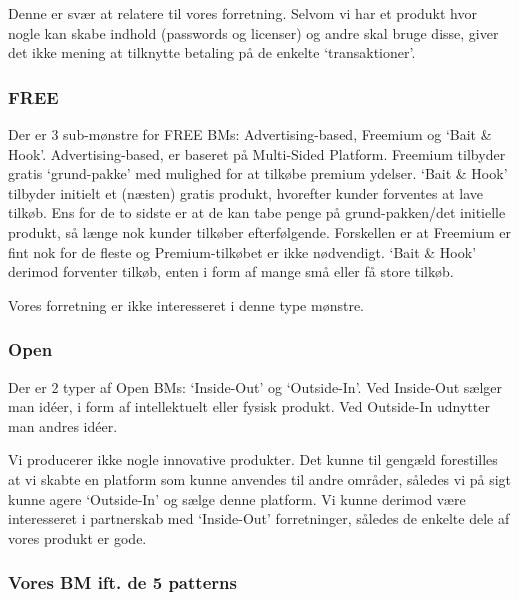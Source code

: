 Denne er svær at relatere til vores forretning.
Selvom vi har et produkt hvor nogle kan skabe indhold (passwords og licenser) og andre skal bruge disse, giver det ikke mening at tilknytte betaling på de enkelte `transaktioner'.

\subsubsection{FREE}
Der er 3 sub-mønstre for FREE BMs: Advertising-based, Freemium og `Bait \& Hook'.
Advertising-based, er baseret på Multi-Sided Platform.
Freemium tilbyder gratis `grund-pakke' med mulighed for at tilkøbe premium ydelser.
`Bait \& Hook' tilbyder initielt et (næsten) gratis produkt, hvorefter kunder forventes at lave tilkøb.
Ens for de to sidste er at de kan tabe penge på grund-pakken/det initielle produkt, så længe nok kunder tilkøber efterfølgende.
Forskellen er at Freemium er fint nok for de fleste og Premium-tilkøbet er ikke nødvendigt.
`Bait \& Hook' derimod forventer tilkøb, enten i form af mange små eller få store tilkøb.

Vores forretning er ikke interesseret i denne type mønstre.

\subsubsection{Open}
Der er 2 typer af Open BMs: `Inside-Out' og `Outside-In'.
Ved Inside-Out sælger man idéer, i form af intellektuelt eller fysisk produkt.
Ved Outside-In udnytter man andres idéer.

Vi producerer ikke nogle innovative produkter.
Det kunne til gengæld forestilles at vi skabte en platform som kunne anvendes til andre områder, således vi på sigt kunne agere `Outside-In' og sælge denne platform.
Vi kunne derimod være interesseret i partnerskab med `Inside-Out' forretninger, således de enkelte dele af vores produkt er gode.

\subsubsection{Vores BM ift. de 5 patterns}
